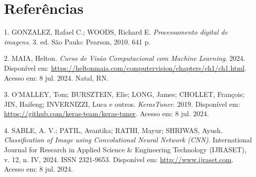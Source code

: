 \documentclass{article}
\begin{document}
\section{Referências}

1. GONZALEZ, Rafael C.; WOODS, Richard E. \textit{Processamento digital de imagens}. 3. ed. São Paulo: Pearson, 2010. 641 p.

2. MAIA, Helton. \textit{Curso de Visão Computacional com Machine Learning}. 2024. Disponível em: \url{https://heltonmaia.com/computervision/chapters/ch1/ch1.html}. Acesso em: 8 jul. 2024. Natal, RN.

3. O'MALLEY, Tom; BURSZTEIN, Elie; LONG, James; CHOLLET, François; JIN, Haifeng; INVERNIZZI, Luca e outros. \textit{KerasTuner}. 2019. Disponível em: \url{https://github.com/keras-team/keras-tuner}. Acesso em: 8 jul. 2024.

4. SABLE, A. V.; PATIL, Avantika; RATHI, Mayur; SHRIWAS, Ayush. \textit{Classification of Image using Convolutional Neural Network (CNN)}. International Journal for Research in Applied Science & Engineering Technology (IJRASET), v. 12, n. IV, 2024. ISSN 2321-9653. Disponível em: \url{http://www.ijraset.com}. Acesso em: 8 jul. 2024.
\end{document}
